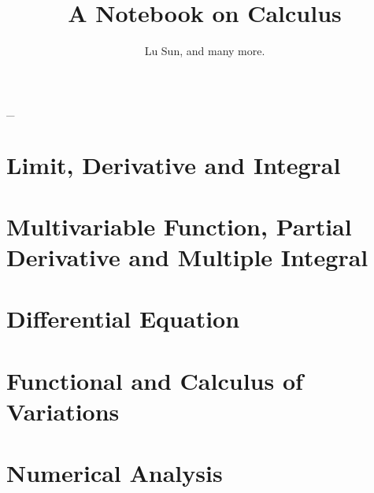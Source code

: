 

\makeindex



\frontmatter

\title{A Notebook on Calculus}
\author{Lu Sun, and many more.}

\maketitle


\tableofcontents


\listoffigures
\listoftables

\mainmatter\_

\part{Limit, Derivative and Integral}







 

\part{Multivariable Function, Partial Derivative and Multiple Integral}







 

\part{Differential Equation}





 

\part{Functional and Calculus of Variations}

 

\part{Numerical Analysis}





 




\printindex



